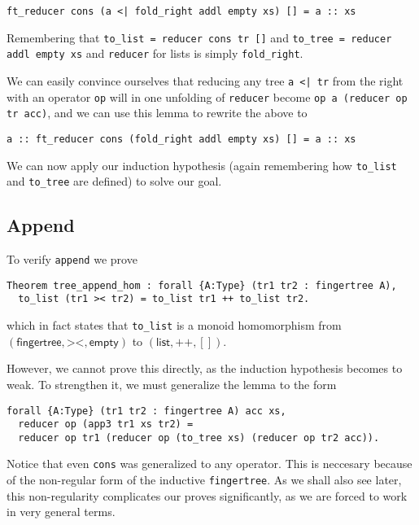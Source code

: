 \documentclass{article}
\newcommand{\code}[1]{\texttt{#1}}
\begin{document}
\begin{verbatim}
ft_reducer cons (a <| fold_right addl empty xs) [] = a :: xs
\end{verbatim}

Remembering that \code{to\_list = reducer cons tr []} and
\code{to\_tree = reducer addl empty xs} and \code{reducer} for lists
is simply \code{fold\_right}.

We can easily convince ourselves that reducing any tree \code{a <| tr}
from the right with an operator \code{op} will in one unfolding of
\code{reducer} become \code{op a (reducer op tr acc)}, and we can use
this lemma to rewrite the above to

\begin{verbatim}
a :: ft_reducer cons (fold_right addl empty xs) [] = a :: xs
\end{verbatim}

We can now apply our induction hypothesis (again remembering how \code{to\_list}
and \code{to\_tree} are defined) to solve our goal.

\subsection{Append}
To verify \code{append} we prove

\begin{verbatim}
Theorem tree_append_hom : forall {A:Type} (tr1 tr2 : fingertree A),
  to_list (tr1 >< tr2) = to_list tr1 ++ to_list tr2.
\end{verbatim}

which in fact states that \code{to\_list} is a monoid homomorphism from
$(\textsf{fingertree}, \code{><}, \textsf{empty})$ to $(\textsf{list}, \code{++}, [])$.

However, we cannot prove this directly, as the induction hypothesis becomes to
weak. To strengthen it, we must generalize the lemma to the form

\begin{verbatim}
forall {A:Type} (tr1 tr2 : fingertree A) acc xs,
  reducer op (app3 tr1 xs tr2) =
  reducer op tr1 (reducer op (to_tree xs) (reducer op tr2 acc)).
\end{verbatim}

Notice that even \code{cons} was generalized to any operator. This is neccesary
because of the non-regular form of the inductive \code{fingertree}. As we shall
also see later, this non-regularity complicates our proves significantly, as
we are forced to work in very general terms.
\end{document}

